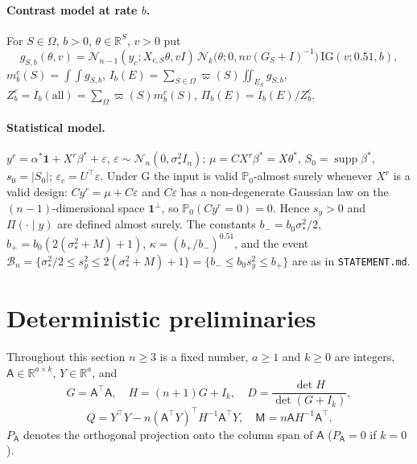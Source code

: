 \documentclass[11pt]{article}
\theoremstyle{remark}
\newcommand{\R}{\mathbb R}
\newcommand{\Prob}{\mathbb P}
\newcommand{\IG}{\mathrm{IG}}
\newcommand{\N}{\mathcal N}
\newcommand{\tr}{^{\top}}
\newcommand{\vp}{\varpi}
\newcommand{\Om}{\Omega}
\newcommand{\B}{\mathcal B}
\newcommand{\sy}{s_y}
\newcommand{\yc}{y_c}
\newcommand{\bm}{b_-}
\newcommand{\bp}{b_+}
\newcommand{\eps}{\varepsilon}
\begin{document}
\paragraph{Contrast model at rate $b$.} For $S\in\Om$, $b>0$, $\theta\in\R^S$, $v>0$ put
\[
g_{S,b}(\theta,v)=\N_{n-1}(\yc;X_{c,S}\theta,vI)\,\N_k\big(\theta;0,nv(G_S+I)^{-1}\big)\,\IG(v;0.51,b),
\]
$m^c_b(S)=\int\!\!\int g_{S,b}$, $I_b(E)=\sum_{S\in\Om}\vp(S)\iint_{E_S}g_{S,b}$, $Z^c_b=I_b(\text{all})=\sum_\Om\vp(S)m^c_b(S)$, $\Pi_b(E)=I_b(E)/Z^c_b$.

\paragraph{Statistical model.} $y^r=\alpha^*\mathbf 1+X^r\beta^*+\eps$, $\eps\sim\N_n(0,\sigma_*^2I_n)$; $\mu=CX^r\beta^*=X\theta^*$, $S_0=\operatorname{supp}\beta^*$, $s_0=|S_0|$; $\eps_c=U\tr\eps$. Under G the input is valid $\Prob_0$-almost surely whenever $X^r$ is a valid design: $Cy^r=\mu+C\eps$ and $C\eps$ has a non-degenerate Gaussian law on the $(n-1)$-dimensional space $\mathbf 1^\perp$, so $\Prob_0(Cy^r=0)=0$. Hence $\sy>0$ and $\Pi(\cdot\mid y)$ are defined almost surely. The constants $\bm=b_0\sigma_*^2/2$, $\bp=b_0(2(\sigma_*^2+M)+1)$, $\kappa=(\bp/\bm)^{0.51}$, and the event $\B_n=\{\sigma_*^2/2\le \sy^2\le 2(\sigma_*^2+M)+1\}=\{\bm\le b_0\sy^2\le\bp\}$ are as in \texttt{STATEMENT.md}.

\section{Deterministic preliminaries}\label{sec:prelim}

Throughout this section $n\ge 3$ is a fixed number, $a\ge1$ and $k\ge0$ are integers, $\mathsf{A}\in\R^{a\times k}$, $Y\in\R^a$, and
\[
G=\mathsf{A}\tr \mathsf{A},\quad H=(n+1)G+I_k,\quad D=\frac{\det H}{\det(G+I_k)},\]\[ Q=Y\tr Y-n(\mathsf{A}\tr Y)\tr H^{-1}\mathsf{A}\tr Y,\quad \mathsf{M}=n\mathsf{A}H^{-1}\mathsf{A}\tr .
\]
$P_{\mathsf{A}}$ denotes the orthogonal projection onto the column span of $\mathsf{A}$ ($P_{\mathsf{A}}=0$ if $k=0$).
\end{document}
